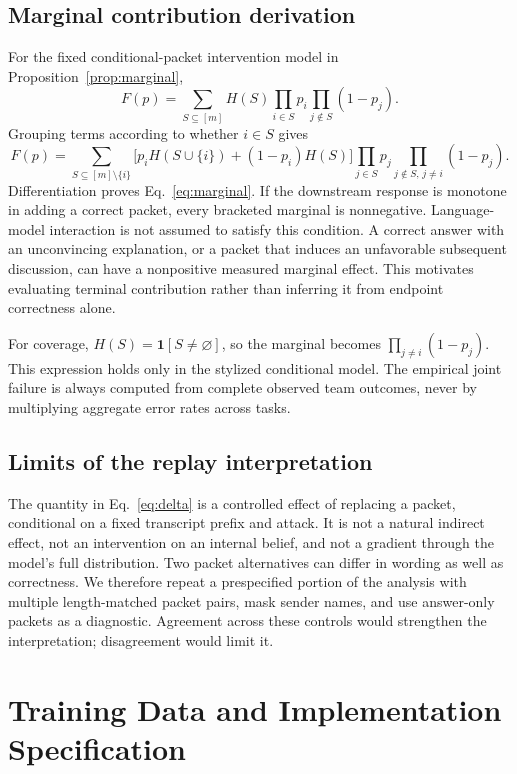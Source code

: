 \documentclass[10pt,twocolumn]{article}
\newcommand{\ind}{\mathbf{1}}
\begin{document}
\subsection{Marginal contribution derivation}
For the fixed conditional-packet intervention model in Proposition~\ref{prop:marginal},
\begin{equation}
 F(p)=\sum_{S\subseteq[m]}H(S)\prod_{i\in S}p_i\prod_{j\notin S}(1-p_j).
\end{equation}
Grouping terms according to whether $i\in S$ gives
\begin{equation}
 F(p)=\sum_{S\subseteq[m]\setminus\{i\}}
 \Big[p_iH(S\cup\{i\})+(1-p_i)H(S)\Big]
 \prod_{j\in S}p_j\prod_{j\notin S,\,j\ne i}(1-p_j).
\end{equation}
Differentiation proves Eq.~\eqref{eq:marginal}. If the downstream response is monotone in adding a correct packet, every bracketed marginal is nonnegative. Language-model interaction is not assumed to satisfy this condition. A correct answer with an unconvincing explanation, or a packet that induces an unfavorable subsequent discussion, can have a nonpositive measured marginal effect. This motivates evaluating terminal contribution rather than inferring it from endpoint correctness alone.

For coverage, $H(S)=\ind[S\ne\varnothing]$, so the marginal becomes $\prod_{j\ne i}(1-p_j)$. This expression holds only in the stylized conditional model. The empirical joint failure is always computed from complete observed team outcomes, never by multiplying aggregate error rates across tasks.

\subsection{Limits of the replay interpretation}
The quantity in Eq.~\eqref{eq:delta} is a controlled effect of replacing a packet, conditional on a fixed transcript prefix and attack. It is not a natural indirect effect, not an intervention on an internal belief, and not a gradient through the model's full distribution. Two packet alternatives can differ in wording as well as correctness. We therefore repeat a prespecified portion of the analysis with multiple length-matched packet pairs, mask sender names, and use answer-only packets as a diagnostic. Agreement across these controls would strengthen the interpretation; disagreement would limit it.

\section{Training Data and Implementation Specification}
\label{app:implementation}
\end{document}
